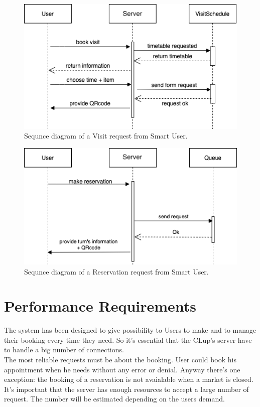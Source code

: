 \begin{figure}[H]
  \caption{Sequnce diagram of a Visit request from Smart User.}
  \label{fig:SD_visit}
  \centering
  \includegraphics[scale=0.45]{diagrams/SD_visit.png}

\end{figure}
\begin{figure}[H]
  \caption{Sequnce diagram of a Reservation request from Smart User.}
  \label{fig:SD_reservation}
  \centering
  \includegraphics[scale=0.45]{diagrams/SD_reservation.png}

\end{figure}

\section{Performance Requirements}
The system has been designed to give possibility to Users to make and to manage their booking every time they need. So it's essential that the CLup's server have to handle a big number of connections. \\
The most reliable requests must be about the booking. User could book his appointment when he needs without any error or denial. 
Anyway there's one exception: the booking of a reservation is not avaialable when a market is closed.\\
It's important that the server has enough resources to accept a large number of request. The number will be estimated depending on the users demand.\\
